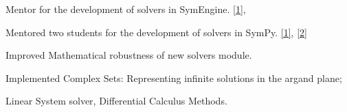 \documentclass[]{deedy-resume-openfont}
\begin{document}
\begin{minipage}[t]{0.66\textwidth}
\vspace{\topsep} %
\begin{tightemize}
\item Mentor for the development of solvers in SymEngine. \href{https://summerofcode.withgoogle.com/projects/#4873488388063232}{[1]}, 


\item Mentored two students for the development of solvers in SymPy. \href{https://summerofcode.withgoogle.com/projects/#6299625891823616}{[1]}, 
\href{https://summerofcode.withgoogle.com/projects/#5440294841483264}{[2]}
\end{tightemize}
\sectionsep

\begin{tightemize}
\item Improved Mathematical robustness of new solvers module.
\item Implemented Complex Sets: Representing infinite solutions in the argand plane;
\item Linear System solver, Differential Calculus Methods.\end{tightemize}
\sectionsep



\end{minipage}
\end{document}
